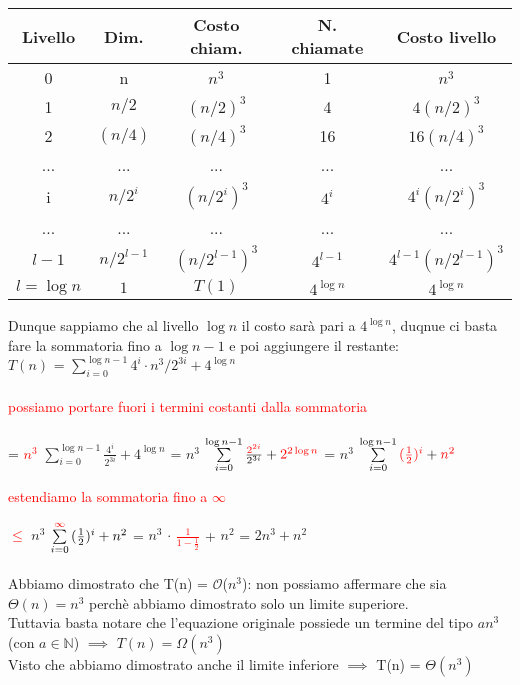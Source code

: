 \documentclass[../cheatSheetAlgoritmi.tex]{subfiles}
\begin{document}
\begin{center}
	\renewcommand{\arraystretch}{1.2}
	\begin{tabular}{ |c|c|c|c|c| } 
		\hline
			Livello & Dim. & Costo chiam. & N. chiamate & Costo livello \\ 
		\hline
			0 & n & $n^3$ & 1 & $n^3$ \\ 
		\hline
			1 & $n/2$ & $(n/2)^{3}$ & 4 & $4(n/2)^{3}$\\ 
		\hline
			2 & $(n/4)$ & $(n/4)^{3}$ & 16 & $16(n/4)^{3}$\\
		\hline
			... & ... & ... & ... & ...\\
		\hline
			i & $n/2^{i}$ & $(n/2^{i})^{3}$ & $4^{i}$ & $4^{i}(n/2^{i})^{3}$\\
		\hline
			... & ... & ... & ... & ...\\
		\hline
			$l-1$ & $n/2^{l-1}$ & $(n/2^{l-1})^{3}$ & $4^{l-1}$ & $4^{l-1}(n/2^{l-1})^{3}$\\
		\hline
			$l = \log{n}$ & $1$ & $T(1)$ & $4^{\log{n}}$ & $4^{\log{n}}$\\
		\hline
	\end{tabular}
\end{center}
Dunque sappiamo che al livello $\log{n}$ il costo sarà pari a $4^{\log{n}}$, duqnue ci basta fare la sommatoria fino a $\log{n-1}$ e poi aggiungere il restante:\\
$T(n)$ =  $\sum\limits_{i=0}^{\log{n-1}} {4^{i} \cdot n^{3}/2^{3i}} + 4^{\log{n}}$\\\\
\textcolor{red}{possiamo portare fuori i termini costanti dalla sommatoria}\\\\
= \textcolor{red}{$n^{3}$} $\sum\limits_{i=0}^{\log{n-1}} {\frac{4^{i}}{2^{3i}}} + 4^{\log{n}}$ = $n^{3}$ $\sum\limits_{i=0}^{\log{n-1}} {\frac{\textcolor{red}{2^{2i}}}{2^{3i}}} + \textcolor{red}{2^{2\log{n}}}$ = $n^{3}$ $\sum\limits_{i=0}^{\log{n-1}} {\textcolor{red}{(\frac{1}{2})^{i}}} + \textcolor{red}{n^{2}}$
\newpage
\begin{flushleft}
\textcolor{red}{estendiamo la sommatoria fino a $\infty$}
\end{flushleft}
\textcolor{red}{$\leq$} $n^{3}$ $\sum\limits_{i=0}^{\textcolor{red}{\infty}} {(\frac{1}{2})^{i}} + n^{2}$ = 
$n^{3}$ $\cdot$ \textcolor{red}{$\frac{1}{1-\frac{1}{2}}$} + $n^{2}$ = $2n^{3} + n^2$\\\\
Abbiamo dimostrato che T(n) = $\mathcal{O}$($n^{3}$): non possiamo affermare che sia $\Theta(n) = n^{3}$ perchè abbiamo dimostrato solo un limite superiore.\\
Tuttavia basta notare che l'equazione originale possiede un termine del tipo $an^{3}$ (con $a \in \mathbb{N}$) $\implies$ $T(n) = \Omega(n^{3})$\\  
Visto che abbiamo dimostrato anche il limite inferiore $\implies$ T(n) = $\Theta(n^{3})$ 
\end{document}
